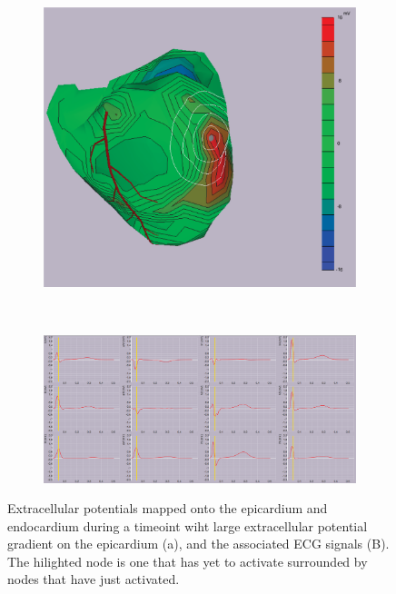 \documentclass[12pt]{article}
\begin{document}
\begin{figure}[H]
	\begin{subfigure}{.75\textwidth}
		\centering
		\includegraphics[width=.95\linewidth]{Figures/1_3_pot_2.png}
		\caption{}
		
	\end{subfigure}%
\\
	\begin{subfigure}{.95\textwidth}
		\centering
		\includegraphics[width=.95\linewidth]{Figures/1_3_ecg_2.png}
		\caption{}
		
	\end{subfigure}
	\caption{Extracellular potentials mapped onto the epicardium and endocardium during a timeoint wiht large extracellular potential gradient on the epicardium (a), and the associated ECG signals (B). The hilighted node is one that has yet to activate surrounded by nodes that have just activated.}
	\label{1_3_2}
\end{figure}
\end{document}
